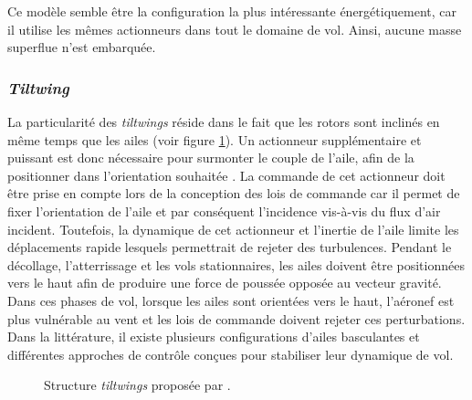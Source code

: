  
        Ce modèle semble être la configuration la plus intéressante énergétiquement, car il utilise les mêmes actionneurs dans tout le domaine de vol. Ainsi, aucune masse superflue n'est embarquée.

    
        \subsubsection*{\textit{Tiltwing}} 
        La particularité des \textit{tiltwings} réside dans le fait que les rotors sont inclinés en même temps que les ailes (voir figure \ref{fig:tiltwing}). Un actionneur supplémentaire et puissant est donc nécessaire pour surmonter le couple de l'aile, afin de la positionner dans l'orientation souhaitée \cite{holsten2011design, rohr2019attitude, ccetinsoy2012design}. La commande de cet actionneur doit être prise en compte lors de la conception des lois de commande {\color{red} car il permet de fixer l'orientation de l'aile et par conséquent l'incidence vis-à-vis du flux d'air incident. Toutefois, la dynamique de cet actionneur et l'inertie de l'aile limite les déplacements rapide lesquels permettrait de rejeter des turbulences.} Pendant le décollage, l'atterrissage et les vols stationnaires, les ailes doivent être positionnées vers le haut afin de produire une force de poussée opposée au vecteur gravité. Dans ces phases de vol, lorsque les ailes sont orientées vers le haut, l'aéronef est plus vulnérable au vent et les lois de commande doivent rejeter ces perturbations. Dans la littérature, il existe plusieurs configurations d'ailes basculantes et différentes approches de contrôle conçues pour stabiliser leur dynamique de vol.
        \begin{figure}[ht!]
            \centering
            \caption{Structure \textit{tiltwings}  proposée par \cite{Aero2_2024, Ostermann2012ControlCO}.}
            \label{fig:tiltwing}
        \end{figure}

